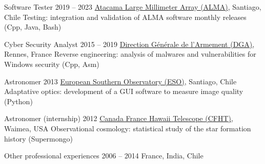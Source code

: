 \begin{joblist}[\tbfwidth][8.4][\tbfyeary]

\setlength{\parskip}{0.3cm}
\vspace{-0.4cm}

\item[Software Tester]{2019 -- 2023}
  {
  \href{https://www.almaobservatory.org}{Atacama Large Millimeter Array (ALMA)}, Santiago, Chile
  }
  {Testing: integration and validation of ALMA software monthly releases (Cpp, Java, Bash)}

\item[Cyber Security Analyst]{2015 -- 2019}
  {
  \href{http://www.defense.gouv.fr/dga/}{Direction Générale de l'Armement (DGA)}, Rennes, France
  }
  {Reverse engineering: analysis of malwares and vulnerabilities for Windows security (Cpp, Asm)}




\item[Astronomer]{2013}
  {
  \href{http://www.eso.org/public/}{European Southern Observatory (ESO)}, Santiago, Chile
  }
  {Adaptative optics: development of a GUI software to measure image quality (Python)}


\item[Astronomer (internship)]{2012}
  {
  \href{https://www.cfht.hawaii.edu/}{Canada France Hawaii Telescope (CFHT)}, Waimea, USA
  }
  {Observational cosmology: statistical study of the star formation history (Supermongo)}


\item[Other professional experiences]{2006 -- 2014}
  {
  France, India, Chile
  }
  {
    \renewcommand\labelitemi{{}}
    \vspace{-0.8cm}
    \setlength{\parskip}{0cm}
    \begin{itemize}[leftmargin=*, label=\textbullet]
    \setlength\itemsep{0cm}



\end{itemize}}
\end{joblist}
